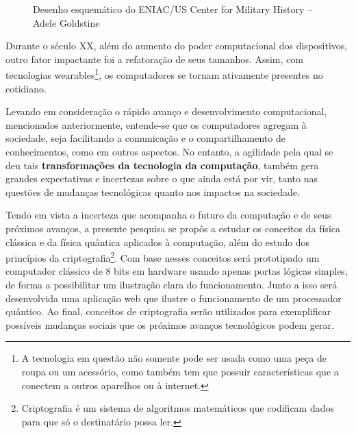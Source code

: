 \vspace{1cm}
\begin{figure}[H] \centering 
  \caption{\label{fig:2} Desenho esquemático do ENIAC/US Center for Military History –
  Adele Goldstine} 
\end{figure}


Durante o século XX, além do aumento do poder computacional dos dispositivos, outro fator impactante foi a refatoração de seus tamanhos. Assim, com tecnologias wearables\footnote{A tecnologia em questão não somente pode ser usada como uma peça de roupa ou um acessório, como também tem que possuir características que a conectem a outros aparelhos ou à internet.}, os computadores se tornam ativamente presentes no cotidiano.

Levando em consideração o rápido avanço e desenvolvimento computacional, mencionados anteriormente, entende-se que os computadores agregam à sociedade, seja facilitando a comunicação e o compartilhamento de conhecimentos, como em outros aspectos. No entanto, a agilidade pela qual se deu tais \textbf{transformações da tecnologia da computação}, também gera grandes expectativas e incertezas sobre o que ainda está por vir, tanto nas questões de mudanças tecnológicas quanto nos impactos na sociedade.

Tendo em vista a incerteza que acompanha o futuro da computação e de seus próximos avanços, a presente pesquisa se propôs a estudar os conceitos da física clássica e da física quântica aplicados à computação, além do estudo dos princípios da criptografia\footnote{Criptografia é um sistema de algoritmos matemáticos que codificam dados para que só o destinatário possa ler.}. Com base nesses conceitos será prototipado um computador clássico de 8 bits em hardware usando apenas portas lógicas simples, de forma a possibilitar um ilustração clara do funcionamento. Junto a isso será desenvolvida uma aplicação web que ilustre o funcionamento de um processador quântico. Ao final, conceitos de criptografia serão utilizados para exemplificar possíveis mudanças sociais que os próximos avanços tecnológicos podem gerar.

